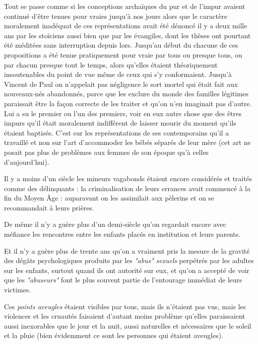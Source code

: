  Tout se passe comme si les conceptions archaïques du pur et de l'impur avaient continué d'être tenues pour vraies jusqu'à nos jours alors que le caractère moralement inadéquat de ces représentations avait été dénoncé il y a deux mille ans par les stoïciens aussi bien que par les évangiles, dont les thèses ont pourtant été méditées sans interruption depuis lors. Jusqu'au début du  chacune de ces propositions a été tenue pratiquement pour vraie par tous ou presque tous, ou par chacun presque tout le temps, alors qu'elles étaient théoriquement insoutenables du point de vue même de ceux qui s'y conformaient. Jusqu'à Vincent de Paul on n'appelait pas négligence le sort mortel qui était fait aux nouveaux-nés abandonnés, parce que les exclure du monde des familles légitimes paraissait être la façon correcte de les traiter et qu'on n'en imaginait pas d'autre. Lui a su le premier ou l'un des premiers, voir en eux autre chose que des êtres impurs qu'il était moralement indifférent de laisser mourir du moment qu'ils étaient baptisés. C'est sur les représentations de ses contemporains qu'il a travaillé et non sur l'art d'accommoder les bébés séparés de leur mère (cet art ne posait pas plus de problèmes aux femmes de son époque qu'à celles d'aujourd'hui). 

 Il y a moins d'un siècle les mineurs vagabonds étaient encore considérés et traités comme des délinquants : la criminalisation de leurs errances avait commencé à la fin du Moyen Âge : auparavant on les assimilait aux pèlerins et on se recommandait à leurs prières. 

 De même il n'y a guère plus d'un demi-siècle qu'on regardait encore avec méfiance les rencontres entre les enfants placés en institution et leurs parents. 

 Et il n'y a guère plus de trente ans qu'on a vraiment pris la mesure de la gravité des dégâts psychologiques produits par les \emph{"abus" sexuels} perpétrés par les adultes sur les enfants, surtout quand ils ont autorité sur eux, et qu'on a accepté de voir que les \emph{"abuseurs"} font le plus souvent partie de l'entourage immédiat de leurs victimes. 
 
 Ces \emph{points aveugles} étaient visibles par tous, mais ils n'étaient pas vus, mais les violences et les cruautés faisaient d'autant moins problème qu'elles paraissaient aussi inexorables que le jour et la nuit, aussi naturelles et nécessaires que le soleil et la pluie (bien évidemment ce sont les personnes qui étaient aveugles). 
 
